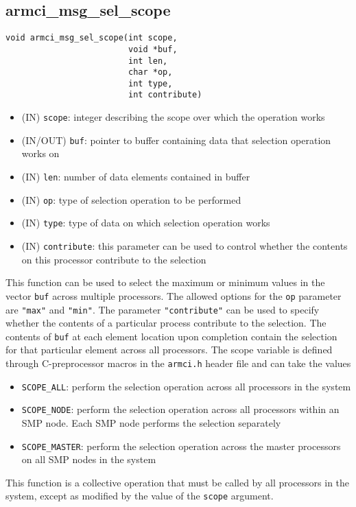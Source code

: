 \documentclass[12pt]{article}
\begin{document}
\subsection{armci\_msg\_sel\_scope}
\begin{verbatim}
void armci_msg_sel_scope(int scope,
                         void *buf,
                         int len,
                         char *op,
                         int type,
                         int contribute)
\end{verbatim}
\begin{itemize}
\item (IN) \texttt{scope}: integer describing the scope over which the operation
works
\item (IN/OUT) \texttt{buf}: pointer to buffer containing data that selection
operation works on
\item (IN) \texttt{len}: number of data elements contained in buffer
\item (IN) \texttt{op}: type of selection operation to be performed
\item (IN) \texttt{type}: type of data on which selection operation works
\item (IN) \texttt{contribute}: this parameter can be used to control whether
the contents on this processor contribute to the selection
\end{itemize}
This function can be used to select the maximum or minimum values in the vector
\texttt{buf} across multiple processors. The allowed options for the \texttt{op}
parameter are \texttt{"max"} and \texttt{"min"}. The parameter
\texttt{"contribute"} can be used to specify whether the contents of a
particular process contribute to the selection. The contents of \texttt{buf} at
each element location upon completion contain the selection for that particular
element across all processors. The scope variable is defined through C-preprocessor
macros in the \texttt{armci.h} header file and can take the values
\begin{itemize}
\item \texttt{SCOPE\_ALL}: perform the selection operation across all processors in
the system
\item \texttt{SCOPE\_NODE}: perform the selection operation across all processors
within an SMP node. Each SMP node performs the selection separately
\item \texttt{SCOPE\_MASTER}: perform the selection operation across the master
processors on all SMP nodes in the system
\end{itemize}
This function is a collective operation that must be called by all processors in
the system, except as modified by the value of the \texttt{scope} argument.
\end{document}

